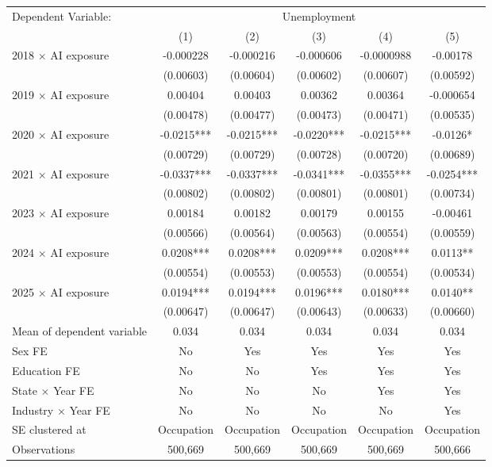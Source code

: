 \def\sym#1{\ifmmode^{#1}\else\(^{#1}\)\fi}
\begin{tabular}{l*{5}{c}}
\toprule
Dependent Variable: & \multicolumn{5}{c}{Unemployment} \\
\cmidrule(lr){2-6}
 & (1) & (2) & (3) & (4) & (5) \\
\midrule
2018 $\times$ AI exposure&   -0.000228   &   -0.000216   &   -0.000606   &  -0.0000988   &    -0.00178   \\
            &   (0.00603)   &   (0.00604)   &   (0.00602)   &   (0.00607)   &   (0.00592)   \\
2019 $\times$ AI exposure&     0.00404   &     0.00403   &     0.00362   &     0.00364   &   -0.000654   \\
            &   (0.00478)   &   (0.00477)   &   (0.00473)   &   (0.00471)   &   (0.00535)   \\
2020 $\times$ AI exposure&     -0.0215***&     -0.0215***&     -0.0220***&     -0.0215***&     -0.0126*  \\
            &   (0.00729)   &   (0.00729)   &   (0.00728)   &   (0.00720)   &   (0.00689)   \\
2021 $\times$ AI exposure&     -0.0337***&     -0.0337***&     -0.0341***&     -0.0355***&     -0.0254***\\
            &   (0.00802)   &   (0.00802)   &   (0.00801)   &   (0.00801)   &   (0.00734)   \\
2023 $\times$ AI exposure&     0.00184   &     0.00182   &     0.00179   &     0.00155   &    -0.00461   \\
            &   (0.00566)   &   (0.00564)   &   (0.00563)   &   (0.00554)   &   (0.00559)   \\
2024 $\times$ AI exposure&      0.0208***&      0.0208***&      0.0209***&      0.0208***&      0.0113** \\
            &   (0.00554)   &   (0.00553)   &   (0.00553)   &   (0.00554)   &   (0.00534)   \\
2025 $\times$ AI exposure&      0.0194***&      0.0194***&      0.0196***&      0.0180***&      0.0140** \\
            &   (0.00647)   &   (0.00647)   &   (0.00643)   &   (0.00633)   &   (0.00660)   \\
\midrule
Mean of dependent variable&       0.034   &       0.034   &       0.034   &       0.034   &       0.034   \\
Sex FE      &          No   &         Yes   &         Yes   &         Yes   &         Yes   \\
Education FE&          No   &          No   &         Yes   &         Yes   &         Yes   \\
State $\times$ Year FE&          No   &          No   &          No   &         Yes   &         Yes   \\
Industry $\times$ Year FE&          No   &          No   &          No   &          No   &         Yes   \\
SE clustered at&  Occupation   &  Occupation   &  Occupation   &  Occupation   &  Occupation   \\
Observations&     500,669   &     500,669   &     500,669   &     500,669   &     500,666   \\
\bottomrule
\end{tabular}
